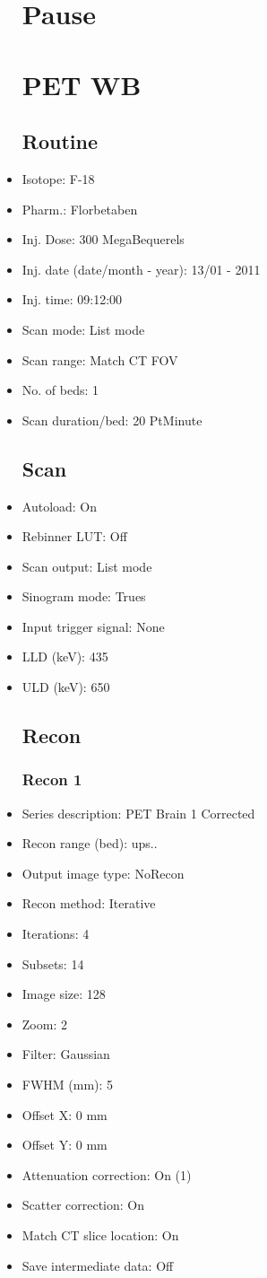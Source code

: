 \documentclass[12pt]{article}
\begin{document}
\begin{itemize}
\section{Pause}

\section{PET WB}
\subsection{Routine}
\item Isotope: F-18
\item Pharm.: Florbetaben
\item Inj. Dose: 300 MegaBequerels
\item Inj. date (date/month - year): 13/01 - 2011
\item Inj. time: 09:12:00
\item Scan mode: List mode
\item Scan range: Match CT FOV
\item No. of beds: 1
\item Scan duration/bed: 20 PtMinute
\subsection{Scan}
\item Autoload: On
\item Rebinner LUT: Off
\item Scan output: List mode
\item Sinogram mode: Trues
\item Input trigger signal: None
\item LLD (keV): 435
\item ULD (keV): 650
\subsection{Recon}

\subsubsection{Recon 1}
\item Series description: PET Brain 1 Corrected
\item Recon range (bed): ups..
\item Output image type: NoRecon
\item Recon method: Iterative
\item Iterations: 4
\item Subsets: 14
\item Image size: 128
\item Zoom: 2
\item Filter: Gaussian
\item FWHM (mm): 5
\item Offset X: 0 mm
\item Offset Y: 0 mm
\item Attenuation correction: On (1)
\item Scatter correction: On
\item Match CT slice location: On
\item Save intermediate data: Off
\end{itemize}
\end{document}
